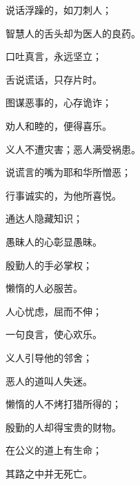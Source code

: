 {\par }{\Q {}说话浮躁的，如刀刺人；
\par }{\Q 智慧人的舌头却为医人的良药。
\par }{\Q {}口吐真言，永远坚立；
\par }{\Q 舌说谎话，只存片时。
\par }{\Q {}图谋恶事的，心存诡诈；
\par }{\Q 劝人和睦的，便得喜乐。
\par }{\Q {}义人不遭灾害；恶人满受祸患。
\par }{\Q {}说谎言的嘴为耶和华所憎恶；
\par }{\Q 行事诚实的，为他所喜悦。
\par }{\Q {}通达人隐藏知识；
\par }{\Q 愚昧人的心彰显愚昧。
\par }{\Q {}殷勤人的手必掌权；
\par }{\Q 懒惰的人必服苦。
\par }{\Q {}人心忧虑，屈而不伸；
\par }{\Q 一句良言，使心欢乐。
\par }{\Q {}义人引导他的邻舍；
\par }{\Q 恶人的道叫人失迷。
\par }{\Q {}懒惰的人不烤打猎所得的；
\par }{\Q 殷勤的人却得宝贵的财物。
\par }{\Q {}在公义的道上有生命；
\par }{\Q 其路之中并无死亡。

}
